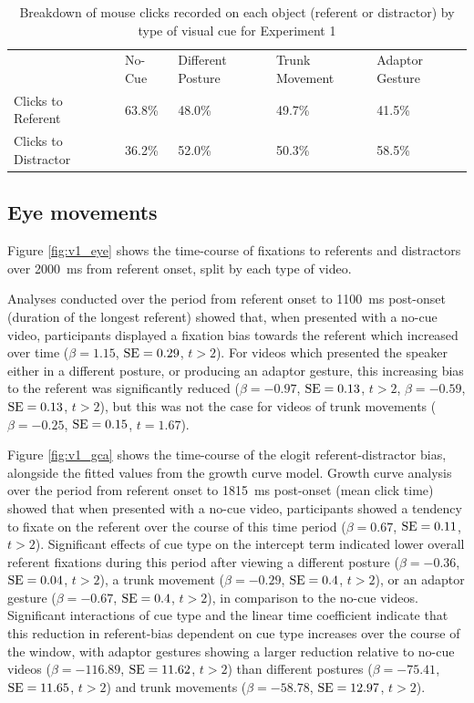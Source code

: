 \documentclass[a4paper,man,natbib]{apa6}
\newcommand{\resultsLM}[3]{$\beta = #1$, $\textnormal{SE} = #2$, $t #3$}
\begin{document}
\begin{table}
\caption{Breakdown of mouse clicks recorded on each object (referent or distractor) by type of visual cue for Experiment 1}
\label{table:v1_clicks}
\begin{tabularx}{\linewidth}{YYYYY}
\hline
& No-Cue & Different Posture & Trunk Movement & Adaptor Gesture \\
Clicks to Referent & 63.8\% & 48.0\% & 49.7\% & 41.5\%  \\ 
Clicks to Distractor & 36.2\% & 52.0\% & 50.3\% & 58.5\% \\
\hline
\end{tabularx}
\end{table}

\subsection{Eye movements}
Figure \ref{fig:v1_eye} shows the time-course of fixations to referents and distractors over 2000~ms from referent onset, split by each type of video.

Analyses conducted over the period from referent onset to 1100~ms post-onset (duration of the longest referent) showed that, when presented with a no-cue video, participants displayed a fixation bias towards the referent which increased over time (\resultsLM{1.15}{0.29}{>2}).
For videos which presented the speaker either in a different posture, or producing an adaptor gesture, this increasing bias to the referent was significantly reduced
(\resultsLM{-0.97}{0.13}{>2}, \resultsLM{-0.59}{0.13}{>2}), but this was not the case for videos of trunk movements (\resultsLM{-0.25}{0.15}{=1.67}). 

Figure \ref{fig:v1_gca} shows the time-course of the elogit referent-distractor bias, alongside the fitted values from the growth curve model. 
Growth curve analysis over the period from referent onset to 1815~ms post-onset (mean click time) showed that when presented with a no-cue video, participants showed a tendency to fixate on the referent over the course of this time period (\resultsLM{0.67}{0.11}{>2}). 
Significant effects of cue type on the intercept term indicated lower overall referent fixations during this period after viewing a different posture (\resultsLM{-0.36}{0.04}{>2}), a trunk movement (\resultsLM{-0.29}{0.4}{>2}), or an adaptor gesture (\resultsLM{-0.67}{0.4}{>2}), in comparison to the no-cue videos.
Significant interactions of cue type and the linear time coefficient indicate that this reduction in referent-bias dependent on cue type increases over the course of the window, with adaptor gestures showing a larger reduction relative to no-cue videos (\resultsLM{-116.89}{11.62}{>2}) than different postures (\resultsLM{-75.41}{11.65}{>2}) and trunk movements (\resultsLM{-58.78}{12.97}{>2}). 
\end{document}
